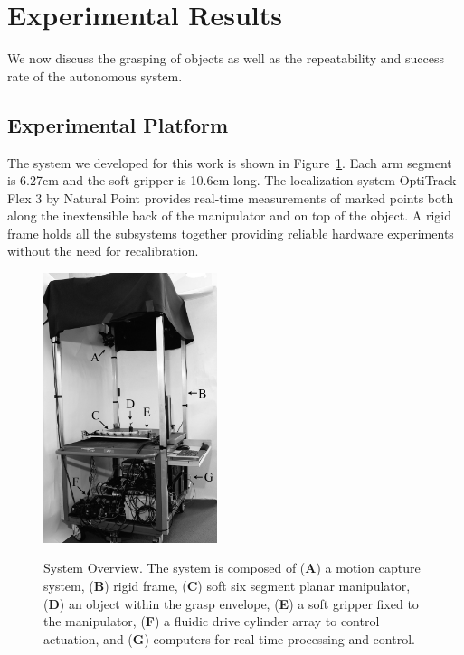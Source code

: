 \section{Experimental Results}
\label{sec:experimental_results}
We now discuss the grasping of objects as well as the repeatability and success rate of the autonomous system.
 
\subsection{Experimental Platform}
The  system we developed for this work is shown in Figure~\ref{fig:experimental_platform}.
Each arm segment is 6.27\unit{cm} and the soft gripper is 10.6\unit{cm} long.
The localization system OptiTrack Flex 3 by Natural Point provides real-time measurements of marked points both along the inextensible back of the manipulator and on top of the object. 
A rigid frame holds all the subsystems  together providing reliable hardware experiments without the need for recalibration.

\begin{figure}[htbp]
\begin{centering}
  \includegraphics[width=2.0in]{Figures/system_overview/sys_overview_smaller_bw.jpg}\\
  \caption{System Overview. The system is composed of (\textbf{A}) a motion capture system, (\textbf{B}) rigid frame, (\textbf{C}) soft six segment planar manipulator, (\textbf{D}) an object within the grasp envelope, (\textbf{E}) a soft gripper fixed to the manipulator, (\textbf{F}) a fluidic drive cylinder array to control actuation, and (\textbf{G}) computers for real-time processing and control.} \label{fig:experimental_platform}
\end{centering}
\end{figure}


